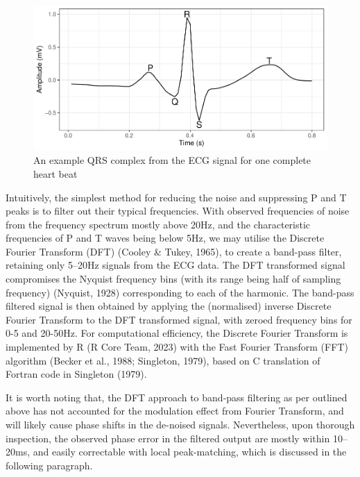 \documentclass[
]{article}
\begin{document}
\begin{figure}

{\centering \includegraphics{report_files/figure-latex/qrs-1} 

}

\caption{An example QRS complex from the ECG signal for one complete heart beat}\label{fig:qrs}
\end{figure}

Intuitively, the simplest method for reducing the noise and suppressing
P and T peaks is to filter out their typical frequencies. With observed
frequencies of noise from the frequency spectrum mostly above 20Hz, and
the characteristic frequencies of P and T waves being below 5Hz, we may
utilise the Discrete Fourier Transform (DFT) (Cooley \& Tukey, 1965), to
create a band-pass filter, retaining only 5--20Hz signals from the ECG
data. The DFT transformed signal compromises the Nyquist frequency bins
(with its range being half of sampling frequency) (Nyquist, 1928)
corresponding to each of the harmonic. The band-pass filtered signal is
then obtained by applying the (normalised) inverse Discrete Fourier
Transform to the DFT transformed signal, with zeroed frequency bins for
0-5 and 20-50Hz. For computational efficiency, the Discrete Fourier
Transform is implemented by R (R Core Team, 2023) with the Fast Fourier
Transform (FFT) algorithm (Becker et al., 1988; Singleton, 1979), based
on C translation of Fortran code in Singleton (1979).

It is worth noting that, the DFT approach to band-pass filtering as per
outlined above has not accounted for the modulation effect from Fourier
Transform, and will likely cause phase shifts in the de-noised signals.
Nevertheless, upon thorough inspection, the observed phase error in the
filtered output are mostly within 10--20ms, and easily correctable with
local peak-matching, which is discussed in the following paragraph.
\end{document}
